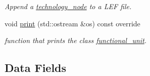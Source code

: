 \begin{DoxyCompactItemize}
\begin{DoxyCompactList}\small\item\em Append a \hyperlink{structtechnology__node}{technology\+\_\+node} to a L\+EF file. \end{DoxyCompactList}\item 
void \hyperlink{structfunctional__unit_a2ab8e656144661fc27df14e7d5649dde}{print} (std\+::ostream \&os) const override
\begin{DoxyCompactList}\small\item\em function that prints the class \hyperlink{structfunctional__unit}{functional\+\_\+unit}. \end{DoxyCompactList}\end{DoxyCompactItemize}
\subsection*{Data Fields}
